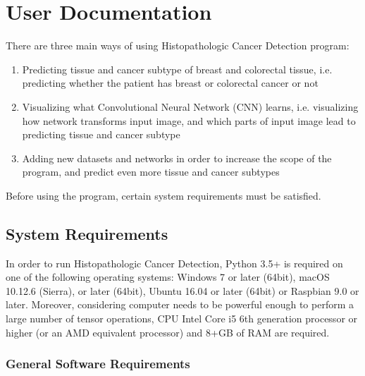 \chapter{User Documentation}
\label{ch:user}

There are three main ways of using Histopathologic Cancer Detection program:
\begin{enumerate}
	\itemsep 0em
	\item Predicting tissue and cancer subtype of breast and colorectal tissue, i.e. predicting whether the patient has breast or colorectal cancer or not
	\item Visualizing what Convolutional Neural Network (CNN) learns, i.e. visualizing how network transforms input image, and which parts of input image lead to predicting tissue and cancer subtype
	\item Adding new datasets and networks in order to increase the scope of the program, and predict even more tissue and cancer subtypes
\end{enumerate}
Before using the program, certain system requirements must be satisfied.

\section{System Requirements}
\label{sysreq}

In order to run Histopathologic Cancer Detection, Python 3.5+ is required on one of the following operating systems: Windows 7 or later (64bit), macOS 10.12.6 (Sierra), or later (64bit), Ubuntu 16.04 or later (64bit) or Raspbian 9.0 or later. Moreover, considering computer needs to be powerful enough to perform a large number of tensor operations, CPU Intel Core i5 6th generation processor or higher (or an AMD equivalent processor) and 8+GB of RAM are required.

\subsection{General Software Requirements}

